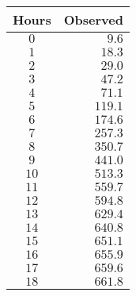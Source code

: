 \begin{tabular}{cr} \toprule
Hours & Observed \\\midrule
$0$   & $9.6$    \\[4pt]
$1$   & $18.3$   \\[4pt]
$2$   & $29.0$   \\[4pt]
$3$   & $47.2$   \\[4pt]
$4$   & $71.1$   \\[4pt]
$5$   & $119.1$  \\[4pt]
$6$   & $174.6$  \\[4pt]
$7$   & $257.3$  \\[4pt]
$8$   & $350.7$  \\[4pt]
$9$   & $441.0$  \\[4pt]
$10$  & $513.3$  \\[4pt]
$11$  & $559.7$  \\[4pt]
$12$  & $594.8$  \\[4pt]
$13$  & $629.4$  \\[4pt]
$14$  & $640.8$  \\[4pt]
$15$  & $651.1$  \\[4pt]
$16$  & $655.9$  \\[4pt]
$17$  & $659.6$  \\[4pt]
$18$  & $661.8$  \\\bottomrule
\end{tabular}
